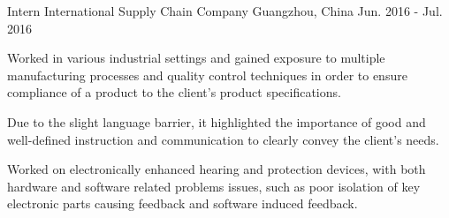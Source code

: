 \begin{cventries}
\cventry
{Intern} %
{International Supply Chain Company} %
{Guangzhou, China} %
{Jun. 2016 - Jul. 2016} %
{ %
\begin{cvitems}
\item {Worked in various industrial settings and gained exposure to multiple manufacturing processes and quality control techniques in order to ensure compliance of a product to the client's product specifications.}
\item {Due to the slight language barrier, it highlighted the importance of good and well-defined instruction and communication to clearly convey the client’s needs.}
\item {Worked on electronically enhanced hearing and protection devices, with both hardware and software related problems issues, such as poor isolation of key electronic parts causing feedback and software induced feedback.}
\end{cvitems}
}





\end{cventries}
